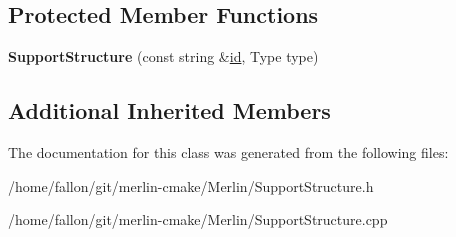 \subsection*{Protected Member Functions}
\begin{DoxyCompactItemize}
\item 
\mbox{\label{classSupportStructure_a0326e007c12540947dc3f4c0862ca835}} 
{\bfseries Support\+Structure} (const string \&\hyperlink{classModelElement_aada171ead2085c75b592cf07d91bc5c2}{id}, Type type)
\end{DoxyCompactItemize}
\subsection*{Additional Inherited Members}


The documentation for this class was generated from the following files\+:\begin{DoxyCompactItemize}
\item 
/home/fallon/git/merlin-\/cmake/\+Merlin/Support\+Structure.\+h\item 
/home/fallon/git/merlin-\/cmake/\+Merlin/Support\+Structure.\+cpp\end{DoxyCompactItemize}
